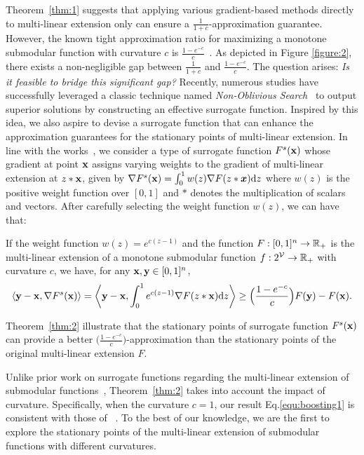 Theorem~\ref{thm:1} suggests that applying various gradient-based methods directly to multi-linear extension only can ensure a $\frac{1}{1+c}$-approximation guarantee. However, the known tight approximation ratio for maximizing a monotone submodular function with curvature $c$ is $\frac{1-e^{-c}}{c}$~\citep{vondrak2010submodularity,bian2017guarantees}. As depicted in Figure \ref{figure:2}, there exists a non-negligible gap between $\frac{1}{1+c}$ and $\frac{1-e^{-c}}{c}$. The question arises: \emph{Is it feasible to bridge this significant gap?} Recently, numerous studies have successfully leveraged a classic technique named \emph{Non-Oblivious Search}~\citep{alimonti1994new,khanna1998syntactic,filmus2012power,filmus2014monotone} to output superior solutions by constructing an effective surrogate function. Inspired by this idea, we also aspire to devise a surrogate function that can enhance the approximation guarantees for the stationary points of multi-linear extension. In line with the works~\citep{zhang2022boosting, zhang2024boosting,wan2023bandit}, we consider a type of surrogate function  $F^{s}(\mathbf{x})$ whose gradient at point $\mathbf{x}$ assigns varying  weights to the gradient of multi-linear extension at  $z*\mathbf{x}$, given by $\nabla F^{s}(\mathbf{x})=\int_{0}^{1} w(z)\nabla F(z*\boldsymbol{x})\mathrm{d}z$ where $w(z)$ is the positive weight function over $[0,1]$ and $*$ denotes the multiplication of scalars and vectors.
After carefully
selecting the weight function $w(z)$, we can have that:
	\begin{theorem}\label{thm:2}If the weight function $w(z)=e^{c(z-1)}$ and the function  $F:[0,1]^{n}\rightarrow\mathbb{R}_{+}$ is the multi-linear extension of a monotone submodular function $f:2^{\mathcal{V}}\rightarrow\mathbb{R}_{+}$ with curvature $c$, we have, for any $\mathbf{x},\mathbf{y}\in[0,1]^{n}$,
    \begin{equation}\label{equ:boosting1}
				\langle\mathbf{y}-\mathbf{x},\nabla F^{s}(\mathbf{x})\rangle=\left\langle\mathbf{y}-\mathbf{x},\int_{0}^{1}e^{c(z-1)}\nabla F(z*\mathbf{x})\mathrm{d}z\right\rangle\ge\Big(\frac{1-e^{-c}}{c}\Big)F(\mathbf{y})-F(\mathbf{x}).
		\end{equation}
	\end{theorem}
\begin{remark}
Theorem~\ref{thm:2} illustrate that the stationary points of surrogate function $F^{s}(\mathbf{x})$ can provide a better $\Big(\frac{1-e^{-c}}{c}\Big)$-approximation than the stationary points of the original multi-linear extension $F$. 
\end{remark}
\begin{remark}
Unlike prior work on surrogate functions regarding the multi-linear extension of submodular functions~\citep{zhang2022boosting,zhang2024boosting}, Theorem~\ref{thm:2} takes into account the impact of curvature. Specifically, when the curvature $c=1$,  our result Eq.\eqref{equ:boosting1} is consistent with those  of ~\citet{zhang2022boosting,zhang2024boosting}. To the best of our knowledge, we are the first to explore the stationary points of the multi-linear extension of submodular functions with different curvatures.
\end{remark}
